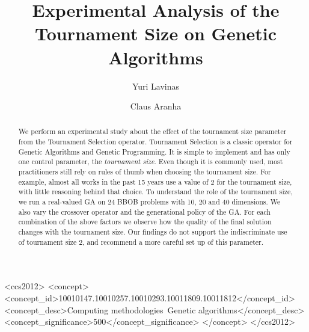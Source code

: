 \documentclass[sigconf, authordraft, anonymous]{acmart}
\begin{document}
\title{Experimental Analysis of the Tournament Size on Genetic Algorithms}

\author{Yuri Lavinas}

\author{Claus Aranha}

\begin{abstract}
We perform an experimental study about the effect of the tournament
size parameter from the Tournament Selection operator. Tournament
Selection is a classic operator for Genetic Algorithms and Genetic
Programming. It is simple to implement and has only one control
parameter, the \emph{tournament size}. Even though it is commonly
used, most practitioners still rely on rules of thumb when choosing
the tournament size. For example, almost all works in the past 15
years use a value of 2 for the tournament size, with little reasoning
behind that choice. To understand the role of the tournament size, we
run a real-valued GA on 24 BBOB problems with 10, 20 and 40
dimensions. We also vary the crossover operator and the generational
policy of the GA. For each combination of the above factors we observe
how the quality of the final solution changes with the tournament
size. Our findings do not support the indiscriminate use of tournament
size 2, and recommend a more careful set up of this parameter.
\end{abstract}

\begin{CCSXML}
<ccs2012>
<concept>
<concept_id>10010147.10010257.10010293.10011809.10011812</concept_id>
<concept_desc>Computing methodologies~Genetic algorithms</concept_desc>
<concept_significance>500</concept_significance>
</concept>
</ccs2012>
\end{CCSXML}




\maketitle

%

 







 
\end{document}
